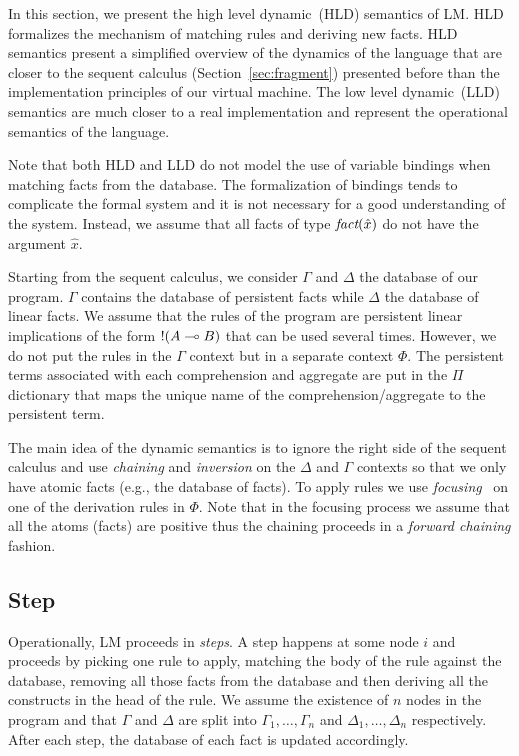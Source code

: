 
In this section, we present the high level dynamic~(HLD) semantics of LM.  HLD
formalizes the mechanism of matching rules and deriving new facts.  HLD
semantics present a simplified overview of the dynamics of the language that are
closer to the sequent calculus (Section~\ref{sec:fragment}) presented before
than the implementation principles of our virtual machine. The low level
dynamic~(LLD) semantics are much closer to a real implementation and
represent the operational semantics of the language.

Note that both HLD and LLD do not model the use of variable bindings when
matching facts from the database. The formalization of bindings tends to
complicate the formal system and it is not necessary for a good understanding of
the system. Instead, we assume that all facts of type $\emph{fact}(\hat{x})$ do
not have the argument $\hat{x}$.

Starting from the sequent calculus, we consider $\Gamma$ and $\Delta$ the
database of our program. $\Gamma$ contains the database of persistent facts
while $\Delta$ the database of linear facts. We assume that the rules of the
program are persistent linear implications of the form ${!} (A \multimap B)$ that
can be used several times. However, we do not put the rules in the $\Gamma$
context but in a separate context $\Phi$. The persistent terms associated with
each comprehension and aggregate are put in the $\Pi$ dictionary that maps the
unique name of the comprehension/aggregate to the persistent term.

The main idea of the dynamic semantics is to ignore the right side of the
sequent calculus and use \emph{chaining} and \emph{inversion} on the $\Delta$
and $\Gamma$ contexts so that we only have atomic facts (e.g., the database of
facts). To apply rules we use
\emph{focusing}~\cite{Andreoli92logicprogramming} on one of the derivation rules
in $\Phi$. Note that in the focusing process we assume that all the atoms
(facts) are positive thus the chaining proceeds in a \emph{forward chaining}
fashion.

\subsection{Step}\label{sec:step_hld}

Operationally, LM proceeds in \emph{steps}. A step happens at some node $i$ and
proceeds by picking one rule to apply, matching the body of the rule against the
database, removing all those facts from the database and then deriving all the
constructs in the head of the rule. We assume the existence of $n$ nodes in the
program and that $\Gamma$ and $\Delta$ are split into $\Gamma_1, \dotsc,
\Gamma_n$ and $\Delta_1, \dotsc, \Delta_n$ respectively. After each
step, the database of each fact is updated accordingly.

